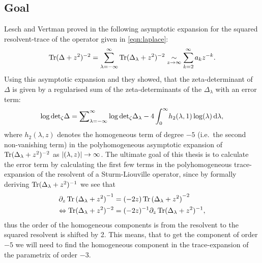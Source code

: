 \subsection{Goal}
Lesch and Vertman proved in \cite{LV13} the following asymptotic expansion for
the squared resolvent-trace of the operator given in \eqref{eqn:laplace}:
\begin{align}
  \operatorname{Tr}(\Delta + z^2)^{-2} = \sum_{\lambda=-\infty}^\infty \operatorname{Tr}(\Delta_\lambda +
  z^2)^{-2} \mathrel{\underset{z\to\infty}{\sim}} \sum_{k=2}^{\infty} a_kz^{-k}.
\end{align}
Using this asymptotic expansion and  they showed, that the
zeta-determinant of $\Delta$ is given by a regularised sum of the
zeta-determinants of the $\Delta_\lambda$ with an error term:
\begin{align}
  \label{eqn:central-thm}
  \log\zdet\Delta = \Regsum_{\lambda=-\infty}^\infty
  \log\zdet\Delta_\lambda -
  4\Integ[\infty]{0}{\lambda}{h_2(\lambda, 1)\log(\lambda)},
\end{align}
where $h_2(\lambda, z)$ denotes the homogeneous term of degree $-5$ (i.e.\ the
second non-vanishing term) in the polyhomogeneous asymptotic expansion of
$\operatorname{Tr}(\Delta_\lambda + z^2)^{-2}$ as $\left|(\lambda, z)\right|\to\infty$. The ultimate
goal of this thesis is to calculate the error term by calculating the first few
terms in the polyhomogeneous trace-expansion of the resolvent of a
Sturm-Liouville operator, since by formally deriving $\operatorname{Tr}(\Delta_\lambda +
z^2)^{-1}$ we see that
\begin{align}
  \label{frm:shift}
  \partial_z \Tr{(\Delta_\lambda + z^2)}^{-1} &=
        (-2z) \Tr{(\Delta_\lambda + z^2)}^{-2} \\
        \Leftrightarrow \Tr(\Delta_\lambda + z^2)^{-2} &=
        (-2z)^{-1}\partial_z\Tr(\Delta_\lambda + z^2)^{-1},
\end{align}
thus the order of the homogeneous components is from the resolvent to the
squared resolvent is shifted by 2. This means, that to get the component of
order $-5$ we will need to find the homogeneous component in the trace-expansion
of the parametrix of order $-3$.
